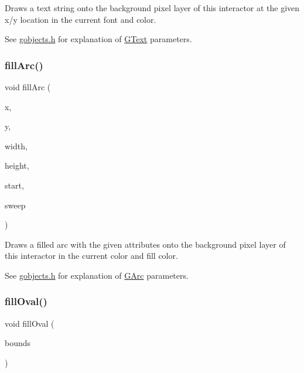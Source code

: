 Draws a text string onto the background pixel layer of this interactor at the given x/y location in the current font and color. 

See \mbox{\hyperlink{gobjects_8h_source}{gobjects.\+h}} for explanation of \mbox{\hyperlink{classsgl_1_1GText}{G\+Text}} parameters. \mbox{\label{classsgl_1_1GDrawingSurface_a228075ad18bd97b57f9956568c4773f3}} 
\subsubsection{\texorpdfstring{fill\+Arc()}{fillArc()}}
{\footnotesize\ttfamily void fill\+Arc (\begin{DoxyParamCaption}\item[{double}]{x,  }\item[{double}]{y,  }\item[{double}]{width,  }\item[{double}]{height,  }\item[{double}]{start,  }\item[{double}]{sweep }\end{DoxyParamCaption})\hspace{0.3cm}{\ttfamily [virtual]}}



Draws a filled arc with the given attributes onto the background pixel layer of this interactor in the current color and fill color. 

See \mbox{\hyperlink{gobjects_8h_source}{gobjects.\+h}} for explanation of \mbox{\hyperlink{classsgl_1_1GArc}{G\+Arc}} parameters. \mbox{\label{classsgl_1_1GDrawingSurface_a1ea6e48d59fb588797dba4deab1397e0}} 
\subsubsection{\texorpdfstring{fill\+Oval()}{fillOval()}\hspace{0.1cm}{\footnotesize\ttfamily [1/2]}}
{\footnotesize\ttfamily void fill\+Oval (\begin{DoxyParamCaption}\item[{const \mbox{\hyperlink{structsgl_1_1GRectangle}{G\+Rectangle}} \&}]{bounds }\end{DoxyParamCaption})\hspace{0.3cm}{\ttfamily [virtual]}}



